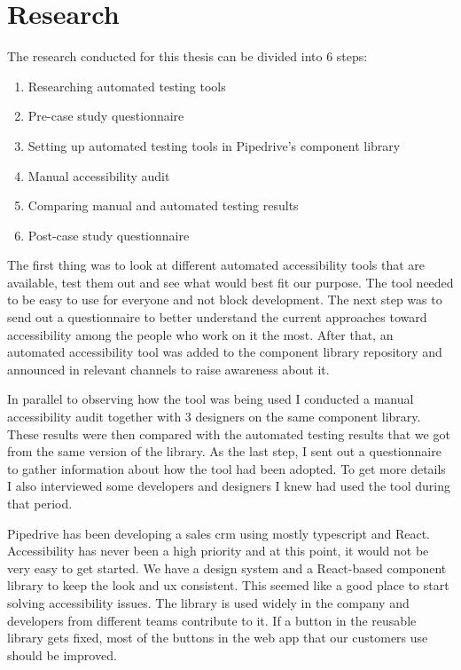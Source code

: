 \documentclass{master_thesis}
\begin{document}
\section{Research}


The research conducted for this thesis can be divided into 6 steps:

\begin{enumerate}
	\item Researching automated testing tools
	\item Pre-case study questionnaire
	\item Setting up automated testing tools in Pipedrive's component library
	\item Manual accessibility audit
	\item Comparing manual and automated testing results
	\item Post-case study questionnaire
\end{enumerate}

The first thing was to look at different automated accessibility tools that are available, test them out and see what would best fit our purpose. The tool needed to be easy to use for everyone and not block development. The next step was to send out a questionnaire to better understand the current approaches toward accessibility among the people who work on it the most. After that, an automated accessibility tool was added to the component library repository and announced in relevant channels to raise awareness about it.

In parallel to observing how the tool was being used I conducted a manual accessibility audit together with 3 designers on the same component library. These results were then compared with the automated testing results that we got from the same version of the library. As the last step, I sent out a questionnaire to gather information about how the tool had been adopted. To get more details I also interviewed some developers and designers I knew had used the tool during that period.

Pipedrive has been developing a sales \ac{crm} using mostly typescript and React. Accessibility has never been a high priority and at this point, it would not be very easy to get started. We have a design system and a React-based component library to keep the look and \ac{ux} consistent. This seemed like a good place to start solving accessibility issues. The library is used widely in the company and developers from different teams contribute to it. If a button in the reusable library gets fixed, most of the buttons in the web app that our customers use should be improved.
\end{document}
